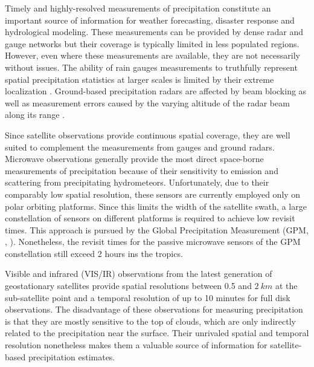 \documentclass[journal abbreviation, manuscript]{copernicus}
\begin{document}
\introduction  %

Timely and highly-resolved measurements of precipitation constitute an important
source of information for weather forecasting, disaster response and
hydrological modeling. These measurements can be provided by dense radar and
gauge networks but their coverage is typically limited in less populated
regions. However, even where these measurements are available, they are not
necessarily without issues. The ability of rain gauges measurements to
truthfully represent spatial precipitation statistics at larger scales is
limited by their extreme localization \citep{smith96}. Ground-based
precipitation radars are affected by beam blocking as well as measurement errors
caused by the varying altitude of the radar beam along its range
\citep{holleman07}.

Since satellite observations provide continuous spatial coverage, they are well
suited to complement the measurements from gauges and ground radars. Microwave
observations generally provide the most direct space-borne measurements of
precipitation because of their sensitivity to emission and scattering from
precipitating hydrometeors. Unfortunately, due to their comparably low spatial
resolution, these sensors are currently employed only on polar orbiting
platforms. Since this limits the width of the satellite swath, a large
constellation of sensors on different platforms is required to achieve low
revisit times. This approach is pursued by the Global Precipitation Measurement
(GPM, \citeauthor{hou14}, \citeyear{hou14}). Nonetheless, the revisit times for
the passive microwave sensors of the GPM constellation still exceed 2 hours ins
the tropics.

Visible and infrared (VIS/IR) observations from the latest generation of
geostationary satellites \citep{schmit05} provide spatial resolutions between
0.5 and $2\ \unit{km}$ at the sub-satellite point and a temporal resolution of
up to 10 minutes for full disk observations. The disadvantage of these
observations for measuring precipitation is that they are mostly sensitive to
the top of clouds, which are only indirectly related to the precipitation near
the surface. Their unrivaled spatial and temporal resolution nonetheless makes
them a valuable source of information for satellite-based precipitation
estimates.
\end{document}
